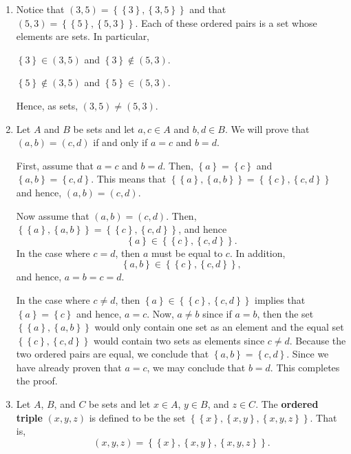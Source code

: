 \documentclass[11pt]{article}
\begin{document}
\begin{enumerate}
\item Notice that $\left( {3, 5} \right) = \left\{ {\left\{ 3 \right\},\left\{ {3, 5} \right\}} \right\}$ and that  $\left( {5, 3} \right) = \left\{ {\left\{ 5 \right\},\left\{ {5, 3} \right\}} \right\}$.  Each of these ordered pairs is a set whose elements are sets.  In particular,
\begin{center}
$\left\{ 3 \right\} \in \left( {3, 5} \right)$ and 
$\left\{ 3 \right\} \notin \left( {5, 3} \right)$.

$\left\{ 5 \right\} \notin \left( {3, 5} \right)$ and 
$\left\{ 5 \right\} \in \left( {5, 3} \right)$.
\end{center}
Hence, as sets, $\left( {3, 5} \right) \ne \left( {5, 3} \right)$.

\item Let  $A$  and  $B$  be sets and let  $a,c \in A$  and  $b,d \in B$.  We will prove that  $\left( {a,b} \right) = \left( {c,d} \right)$  if and only if  $a = c$ and $b = d$.

First, assume that $a = c$ and $b = d$.  Then, $\left\{ a \right\} = \left\{ c \right\}$ and 
$\left\{ a, b \right\} = \left\{ c, d \right\}$.  This means that 
$\left\{ {\left\{ a \right\},\left\{ {a, b} \right\}} \right\} = 
\left\{ {\left\{ c \right\},\left\{ {c, d} \right\}} \right\}$ and hence, 
$\left( {a,b} \right) = \left( {c,d} \right)$.

Now assume that $\left( {a,b} \right) = \left( {c,d} \right)$.  Then, 
$\left\{ {\left\{ a \right\},\left\{ {a, b} \right\}} \right\} = 
\left\{ {\left\{ c \right\},\left\{ {c, d} \right\}} \right\}$, and hence
\[
\left\{ a \right\} \in \left\{ {\left\{ c \right\},\left\{ {c, d} \right\}} \right\}.
\]
In the case where $c = d$, then  $a$ must be equal to $c$. In addition,
\[
\left\{ a, b \right\} \in \left\{ {\left\{ c \right\},\left\{ {c, d} \right\}} \right\},
\]
and hence, $a = b = c = d$.  

In the case where $c \ne d$, then 
$\left\{ a \right\} \in \left\{ {\left\{ c \right\},\left\{ {c, d} \right\}} \right\}$ implies that $\left\{ a \right\} = \left\{ c \right\}$ and hence, $a = c$.  Now, $a \ne b$ since if 
$a = b$, then the set $\left\{ {\left\{ a \right\},\left\{ {a, b} \right\}} \right\}$ would only contain one set as an element and the equal set 
$\left\{ {\left\{ c \right\},\left\{ {c, d} \right\}} \right\}$ would contain two sets as elements since $c \ne d$.  Because the two ordered pairs are equal, we conclude that 
$\left\{ a, b \right\} = \left\{ c, d \right\}$.  Since we have already proven that $a = c$, we may conclude that $b = d$.  This completes the proof.

\item Let $A$, $B$, and $C$ be sets and let $x \in A$, $y \in B$, and $z \in C$.  The \textbf{ordered triple} $(x, y, z)$ is defined to be the set $\left\{ \left\{ x \right\}, \left\{ x, y \right\}, \left\{ x, y, z \right\} \right\}$.  That is,
\[
\left( x, y, z \right) = 
\left\{ \left\{ x \right\}, \left\{ x, y \right\}, \left\{ x, y, z \right\} \right\}.
\]




\end{enumerate}
\end{document}
